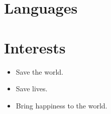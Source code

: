 \documentclass[oneside,spanish,10pt, a4paper]{memoir}
\begin{document}
\section{Languages}
\begin{muList}{2.0}
\end{muList}

\section{Interests}
\begin{itemize}
\setlength\itemsep{-0.1cm}
\item \small Save the world.
\item Save lives.
\item Bring happiness to the world.
\end{itemize}
\end{document}
